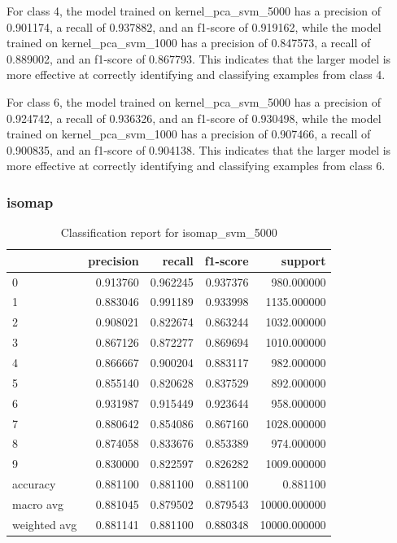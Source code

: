 For class 4, the model trained on kernel_pca_svm_5000 has a precision of 0.901174, a recall of 0.937882, and an f1-score of 0.919162, while the model trained on kernel_pca_svm_1000 has a precision of 0.847573, a recall of 0.889002, and an f1-score of 0.867793. This indicates that the larger model is more effective at correctly identifying and classifying examples from class 4.

For class 6, the model trained on kernel_pca_svm_5000 has a precision of 0.924742, a recall of 0.936326, and an f1-score of 0.930498, while the model trained on kernel_pca_svm_1000 has a precision of 0.907466, a recall of 0.900835, and an f1-score of 0.904138. This indicates that the larger model is more effective at correctly identifying and classifying examples from class 6.

\subsubsection{\gls{isomap}}\label{subsubsec:experiment_4_isomap}


\begin{table}[htb!]
    \centering
    \caption{Classification report for isomap_svm_5000}
    \label{tab:classification-report-isomap_svm_5000}
    \begin{tabular}{lrrrr}
    \toprule
     & precision & recall & f1-score & support \\
    \midrule
    0 & 0.913760 & 0.962245 & 0.937376 & 980.000000 \\
    1 & 0.883046 & 0.991189 & 0.933998 & 1135.000000 \\
    2 & 0.908021 & 0.822674 & 0.863244 & 1032.000000 \\
    3 & 0.867126 & 0.872277 & 0.869694 & 1010.000000 \\
    4 & 0.866667 & 0.900204 & 0.883117 & 982.000000 \\
    5 & 0.855140 & 0.820628 & 0.837529 & 892.000000 \\
    6 & 0.931987 & 0.915449 & 0.923644 & 958.000000 \\
    7 & 0.880642 & 0.854086 & 0.867160 & 1028.000000 \\
    8 & 0.874058 & 0.833676 & 0.853389 & 974.000000 \\
    9 & 0.830000 & 0.822597 & 0.826282 & 1009.000000 \\
    accuracy & 0.881100 & 0.881100 & 0.881100 & 0.881100 \\
    macro avg & 0.881045 & 0.879502 & 0.879543 & 10000.000000 \\
    weighted avg & 0.881141 & 0.881100 & 0.880348 & 10000.000000 \\
    \bottomrule
    \end{tabular}
    \end{table}
    
